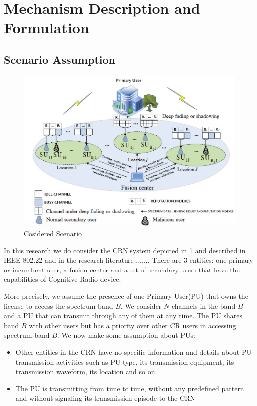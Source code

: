 \documentclass[letterpaper, 10 pt, conference]{ieeeconf}  %
\begin{document}
\section{Mechanism Description and Formulation}
\label{sec3}
\subsection{Scenario Assumption}

\begin{figure}
\centering
\includegraphics[scale=0.5]{figures/CRNscenario.jpg}
\caption{Cosidered Scenario}\label{CRNscen}
\end{figure}
In this research we do consider the CRN system depicted in \ref{CRNscen} and described in IEEE 802.22 and in the research literature \cite{hyder},\cite{rawat},\cite{najimi},\cite{ghaznavi},\cite{ma},\cite{qingao},\cite{qin}. There are 3 entities: one primary or incumbent user, a fusion center and a set of secondary users that have the capabilities of Cognitive Radio device.

More precisely, we assume the presence of one Primary User(PU) that owns the license to access the spectrum band $B$. We consider $N$ channels in the band $B$ and a PU that can transmit through any of them at any time. The PU shares band $B$ with other users but has a priority over other CR users in accessing spectrum band $B$. We now make some assumption about PUs:
\begin{itemize}
\item {Other entities in the CRN have no specific information and details about PU transmission activities such as PU type, its transmission equipment, its transmission waveform, its location and so on.}
\item{The PU is transmitting from time to time, without any predefined pattern and without signaling its transmission episode to the CRN}
\end{itemize}
\end{document}
